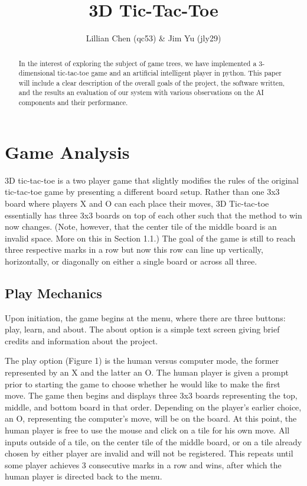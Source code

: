 \documentclass[preprint,12pt]{elsarticle}
\begin{document}
\begin{frontmatter}
	\title{3D Tic-Tac-Toe}
	\author{Lillian Chen (qc53) \& Jim Yu (jly29)}
	\address{Cornell University}

	\begin{abstract}
		In the interest of exploring the subject of game trees, we have implemented a 3-dimensional tic-tac-toe game and an artificial intelligent player in python. This paper will include a clear description of the overall goals of the project, the software written, and the results an evaluation of our system with various observations on the AI components and their performance.
	\end{abstract}
\end{frontmatter}

\section{Game Analysis}
	3D tic-tac-toe is a two player game that slightly modifies the rules of the original tic-tac-toe game by presenting a different board setup. Rather than one 3x3 board where players X and O can each place their moves, 3D Tic-tac-toe essentially has three 3x3 boards on top of each other such that the method to win now changes. (Note, however, that the center tile of the middle board is an invalid space. More on this in Section 1.1.) The goal of the game is still to reach three respective marks in a row but now this row can line up vertically, horizontally, or diagonally on either a single board or across all three.

	\subsection{Play Mechanics}
		Upon initiation, the game begins at the menu, where there are three buttons: play, learn, and about. The about option is a simple text screen giving brief credits and information about the project.

		The play option (Figure 1) is the human versus computer mode, the former represented by an X and the latter an O. The human player is given a prompt prior to starting the game to choose whether he would like to make the first move. The game then begins and displays three 3x3 boards representing the top, middle, and bottom board in that order. Depending on the player's earlier choice, an O, representing the computer's move, will be on the board. At this point, the human player is free to use the mouse and click on a tile for his own move. All inputs outside of a tile, on the center tile of the middle board, or on a tile already chosen by either player are invalid and will not be registered. This repeats until some player achieves 3 consecutive marks in a row and wins, after which the human player is directed back to the menu.
\end{document}
